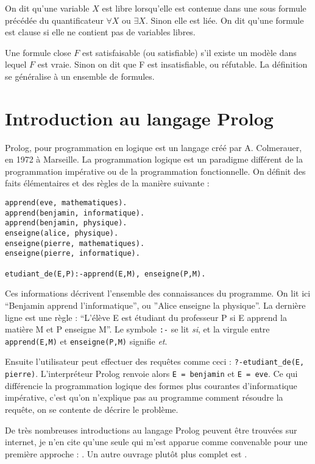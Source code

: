 \documentclass{article}
\begin{document}
On dit qu'une variable $X$ est libre lorsqu'elle est contenue dans une sous formule précédée du quantificateur $\forall X$ ou $\exists X$. Sinon elle est liée. On dit qu'une formule est clause si elle ne contient pas de variables libres.

Une formule close $F$ est satisfaisable (ou satisfiable) s'il existe un modèle dans lequel $F$ est vraie. Sinon on dit que F est insatisfiable, ou réfutable. La définition se généralise à un ensemble de formules.




\section{Introduction au langage Prolog}

Prolog, pour programmation en logique est un langage créé par A. Colmerauer, en 1972 à Marseille. La programmation logique est un paradigme différent de la programmation impérative ou de la programmation fonctionnelle. On définit des faits élémentaires et des règles de la manière suivante :

\begin{verbatim}
apprend(eve, mathematiques).
apprend(benjamin, informatique).
apprend(benjamin, physique).
enseigne(alice, physique).
enseigne(pierre, mathematiques).
enseigne(pierre, informatique).

etudiant_de(E,P):-apprend(E,M), enseigne(P,M).
\end{verbatim}

Ces informations décrivent l'ensemble des connaissances du programme. On lit ici ``Benjamin apprend l'informatique'', ou ''Alice enseigne la physique''. La dernière ligne est une règle : ``L'élève E est étudiant du professeur P si E apprend la matière M et P enseigne M''. Le symbole \texttt{:-} se lit \emph{si}, et la virgule entre \texttt{apprend(E,M)} et \texttt{enseigne(P,M)} signifie \emph{et}.

Ensuite l'utilisateur peut effectuer des requêtes comme ceci : \texttt{?-etudiant\_de(E, pierre)}. L'interpréteur Prolog renvoie alors \texttt{E = benjamin} et \texttt{E = eve}. Ce qui différencie la programmation logique des formes plus courantes d'informatique impérative, c'est qu'on n'explique pas au programme comment résoudre la requête, on se contente de décrire le problème.

De très nombreuses introductions au langage Prolog peuvent être trouvées sur internet, je n'en cite qu'une seule qui m'est apparue comme convenable pour une première approche : \cite{Flach}. Un autre ouvrage plutôt plus complet est \cite{Sterling}.
\end{document}
